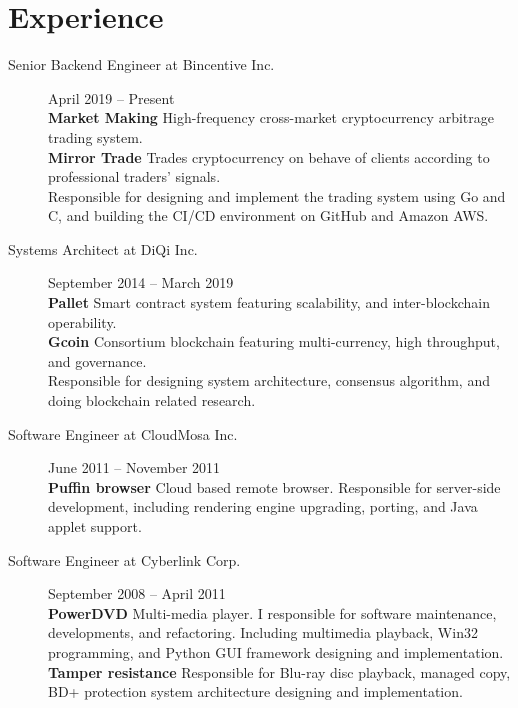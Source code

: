 \documentclass[10pt,a4paper]{article}
\newcommand{\br}{\hfill\\}
\newcommand{\CPP}{C\nolinebreak\hspace{-.05em}\raisebox{.5ex}{\tiny\textbf{++}}}
\begin{document}
\section*{Experience}
\vskip 0.03in
\begin{description}
\item[Senior Backend Engineer at Bincentive Inc.]
April 2019 -- Present\br
\textbf{Market Making} High-frequency cross-market cryptocurrency arbitrage trading system.\br
\textbf{Mirror Trade} Trades cryptocurrency on behave of clients according to professional traders' signals.\br
Responsible for designing and implement the trading system using Go and \CPP, and building the CI/CD environment on GitHub and Amazon AWS.

\item[Systems Architect at DiQi Inc.]
September 2014 -- March 2019\br
\textbf{Pallet} Smart contract system featuring scalability, and inter-blockchain operability.\br
\textbf{Gcoin} Consortium blockchain featuring multi-currency, high throughput, and governance.\br
Responsible for designing system architecture, consensus algorithm, and doing blockchain related research.

\item[Software Engineer at CloudMosa Inc.]
June 2011 -- November 2011\br
\textbf{Puffin browser} Cloud based remote browser. Responsible for server-side development, including rendering engine upgrading, porting, and Java applet support.

\item[Software Engineer at Cyberlink Corp.]
September 2008 -- April 2011\br
\textbf{PowerDVD} Multi-media player. I responsible for software maintenance, developments, and refactoring.
Including multimedia playback, Win32 programming, and Python GUI framework designing and implementation.\br
\textbf{Tamper resistance} Responsible for Blu-ray disc playback, managed copy, BD+ protection system architecture designing and implementation.

%
\end{description}
\end{document}
